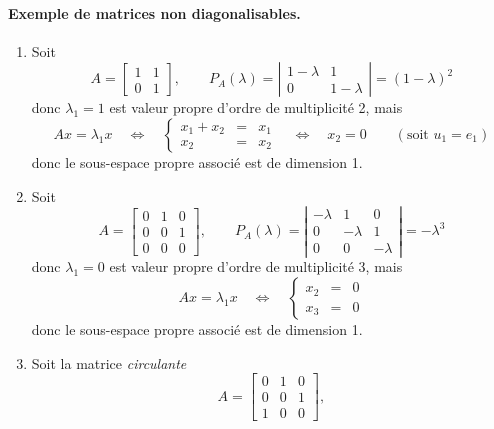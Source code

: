 \paragraph{Exemple de matrices non diagonalisables.}
\begin{enumerate}
 \item Soit
 $$
 A = \left[\begin{array}{cc} 1 & 1 \\ 0 & 1 \end{array}\right],
 \qquad 
 P_A(\lambda) 
 = \left|\begin{array}{cc} 1-\lambda & 1 \\ 0 & 1-\lambda \end{array}\right|
 = (1 - \lambda)^2
 $$
 donc $\lambda_1 = 1$ est valeur propre d'ordre de multiplicité 2, mais
 $$
 Ax = \lambda_1 x \quad \Leftrightarrow \quad 
 \left\{\begin{array}{rcl} x_1 + x_2 & = & x_1 \\ x_2 & = & x_2 \end{array} \right. \quad \Leftrightarrow \quad 
 x_2 = 0
 \qquad (\text{soit } u_1 = e_1)
 $$
 donc le sous-espace propre associé est de dimension 1.
 \item Soit 
 $$
 A = \left[\begin{array}{rrr} 0 & 1 & 0 \\ 0 & 0 & 1 \\ 0 & 0 & 0 \end{array}\right],
 \qquad 
 P_A(\lambda) 
 = \left|\begin{array}{rrr} -\lambda & 1 & 0 \\ 0 & -\lambda & 1 \\ 0 & 0 & -\lambda \end{array}\right|
 = -\lambda^3
 $$
 donc $\lambda_1 = 0$ est valeur propre d'ordre de multiplicité 3, mais
 $$
 A x = \lambda_1 x \quad \Leftrightarrow \quad 
 \left\{\begin{array}{rcl} x_2 & = & 0 \\ x_3 & = & 0 \end{array} \right.
 $$
 donc le sous-espace propre associé est de dimension 1.
 \item Soit la matrice {\em circulante}
 $$
 A = \left[\begin{array}{rrr} 0 & 1 & 0 \\ 0 & 0 & 1 \\ 1 & 0 & 0 \end{array}\right],
$$
\end{enumerate}
